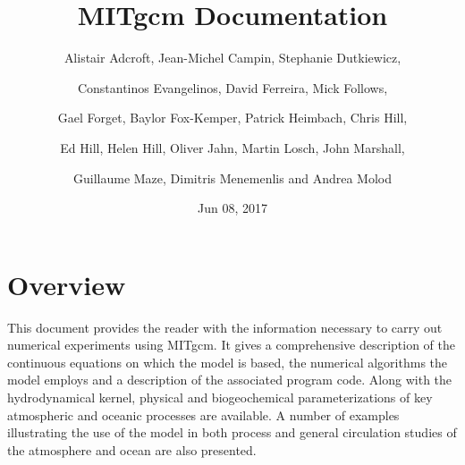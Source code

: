 \documentclass[letterpaper,10pt,english]{sphinxmanual}
\title{MITgcm Documentation}
\date{Jun 08, 2017}
\author{Alistair Adcroft, Jean-Michel Campin, Stephanie Dutkiewicz, \and Constantinos Evangelinos, David Ferreira, Mick Follows, \and Gael Forget, Baylor Fox-Kemper, Patrick Heimbach, Chris Hill, \and Ed Hill, Helen Hill, Oliver Jahn, Martin Losch, John Marshall, \and Guillaume Maze, Dimitris Menemenlis and Andrea Molod}
\begin{document}
\maketitle
\sphinxtableofcontents
{}\label{\detokenize{index::doc}}



\chapter{Overview}
\label{\detokenize{overview/overview:overview}}\label{\detokenize{overview/overview::doc}}\label{\detokenize{overview/overview:welcome-to-mitgcm-s-user-manual}}
This document provides the reader with the information necessary to
carry out numerical experiments using MITgcm. It gives a comprehensive
description of the continuous equations on which the model is based, the
numerical algorithms the model employs and a description of the associated
program code. Along with the hydrodynamical kernel, physical and
biogeochemical parameterizations of key atmospheric and oceanic processes
are available. A number of examples illustrating the use of the model in
both process and general circulation studies of the atmosphere and ocean are
also presented.
\end{document}
